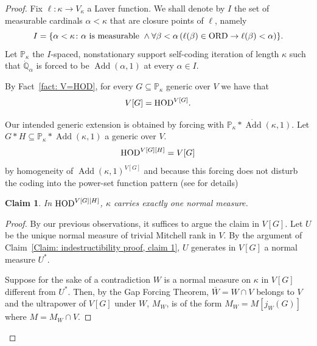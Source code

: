 \documentclass[11pt]{amsart}
\newtheorem{claim}{Claim}[theorem]
\theoremstyle{definition}
\theoremstyle{remark}
\newcommand\HOD{\textnormal{HOD}}
\newcommand\<{{<}}
\DeclareMathOperator{\Add}{Add}
\def\s{\subseteq}
\begin{document}
\begin{proof}
Fix $\ell\colon \kappa\rightarrow V_\kappa$ a Laver function. We shall denote by $I$ the set of measurable cardinals $\alpha<\kappa$ that are closure points of $\ell$, namely
$$I = \{ \alpha<\kappa \colon \alpha \text{ is measurable }\land  \forall \beta<\alpha \left( \ell(\beta)\in {\rm{ORD}}\to \ell(\beta)<\alpha \right) \}.$$
Let $\mathbb{P}_\kappa$ the  $I$-spaced, nonstationary support self-coding iteration of length $\kappa$ such that $\dot{\mathbb{Q}}_\alpha$ is forced to be $\Add(\alpha,1)$ at every $\alpha\in I$.

\smallskip

By Fact~\ref{fact: V=HOD},  for every $G\s \mathbb{P}_\kappa$ generic over $V$ we have that $$V[G]=\HOD^{V[G]}.$$
 

 Our intended generic extension is obtained by forcing with $\mathbb{P}_\kappa\ast \dot{\Add}(\kappa,1)$. Let $G\ast H\s \mathbb{P}_\kappa\ast \Add(\kappa,1)$ a generic over $V$.
  $$\HOD^{V[G][H]}=V[G]$$ by homogeneity of $\Add(\kappa,1)^{V[G]}$ and because this forcing does not disturb the coding into the power-set function pattern (see  \cite{GoldbergPoveda} for details)

\begin{claim}\label{claim: a unique normal measure}
    In  $\HOD^{V[G][H]}$, $\kappa$ carries exactly one normal measure.
\end{claim}
\begin{proof}
By our previous observations, it suffices to argue the claim in  $V[G]$. Let $U$ be the unique normal measure of trivial Mitchell rank in $V$. By the argument of Claim~\ref{Claim: indestructibility proof, claim 1}, $U$ generates in $V[G]$ a normal measure $U^*$.   

Suppose for the sake of a contradiction $W$ is a normal measure on $\kappa$ in $V[G]$ different from $U^*$. Then, by the Gap Forcing Theorem,  $\bar{W}=W\cap V$ belongs to $V$ and the ultrapower of $V[G]$ under $W$, $M_W$, is of the form $M_W=M[j_W(G)]$ where  $M=M_W\cap V$. 


\end{proof}
\end{proof}
\end{document}
